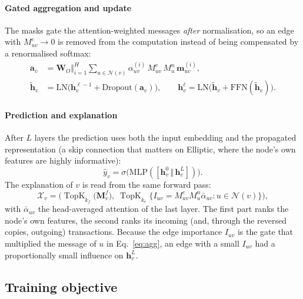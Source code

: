 \paragraph{Gated aggregation and update} The masks gate the attention-weighted messages \emph{after} normalisation, so an edge with $M^e_{uv}\to0$ is removed from the computation instead of being compensated by a renormalised softmax:
\begin{align}
\mathbf{a}_v&=\mathbf{W}_O\Big\Vert_{i=1}^{H}\sum_{u\in\mathcal{N}(v)}\alpha^{(i)}_{uv}\,M^{e}_{uv}\,M^{n}_{u}\,\mathbf{m}^{(i)}_{uv},\label{eq:agg}\\
\tilde{\mathbf{h}}_v&=\mathrm{LN}\big(\mathbf{h}^{\ell-1}_v+\mathrm{Dropout}(\mathbf{a}_v)\big),\qquad
\mathbf{h}^{\ell}_v=\mathrm{LN}\big(\tilde{\mathbf{h}}_v+\mathrm{FFN}(\tilde{\mathbf{h}}_v)\big).\label{eq:update}
\end{align}

\paragraph{Prediction and explanation} After $L$ layers the prediction uses both the input embedding and the propagated representation (a skip connection that matters on Elliptic, where the node's own features are highly informative):
\begin{equation}
\hat y_v=\sigma\big(\mathrm{MLP}([\mathbf{h}^{0}_v\,\Vert\,\mathbf{h}^{L}_v])\big).
\label{eq:pred}
\end{equation}
The explanation of $v$ is read from the same forward pass:
\begin{equation}
\mathcal{X}_v=\Big(\operatorname{TopK}_{k_f}\big(\mathbf{M}^{f}_v\big),\;\operatorname{TopK}_{k_e}\big\{I_{uv}=M^{e}_{uv}M^{n}_{u}\bar\alpha_{uv}:u\in\mathcal{N}(v)\big\}\Big),
\label{eq:explanation}
\end{equation}
with $\bar\alpha_{uv}$ the head-averaged attention of the last layer. The first part ranks the node's own features, the second ranks its incoming (and, through the reversed copies, outgoing) transactions. Because the edge importance $I_{uv}$ is the gate that multiplied the message of $u$ in Eq.~\eqref{eq:agg}, an edge with a small $I_{uv}$ had a proportionally small influence on $\mathbf{h}^L_v$.

\subsection{Training objective}
\label{subsec:training}

